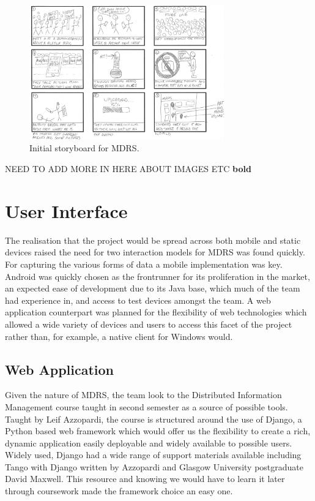 \documentclass{l3proj}
\begin{document}
\begin{figure}[ht!]
  \centering
\includegraphics[width=0.75\textwidth]{images/ally-storyboard.jpg}
\caption{Initial storyboard for MDRS.}
\end{figure}
NEED TO ADD MORE IN HERE ABOUT IMAGES ETC {\bf bold}

\section{User Interface}
The realisation that the project would be spread
across both mobile and static devices raised the need for two interaction models
for MDRS was found quickly. For capturing the various forms of data a mobile
implementation was key. Android was quickly chosen as the frontrunner for its
proliferation in the market, an expected ease of development due to its Java
base, which much of the team had experience in, and access to test devices
amongst the team. A web application counterpart was planned for the flexibility
of web technologies which allowed a wide variety of devices and users to access
this facet of the project rather than, for example, a native client for Windows
would.

\subsection{Web Application}   Given the nature of MDRS, the team look to the
Distributed Information Management course taught in second semester as a source
of possible tools. Taught by Leif Azzopardi, the course is structured around the
use of Django, a Python based web framework which would offer us the flexibility
to create a rich, dynamic application easily deployable and widely available to
possible users. Widely used, Django had a wide range of support materials
available including Tango with Django written by Azzopardi and Glasgow
University postgraduate David Maxwell. This resource and knowing we would have
to learn it later through coursework made the framework choice an easy one.
\end{document}
